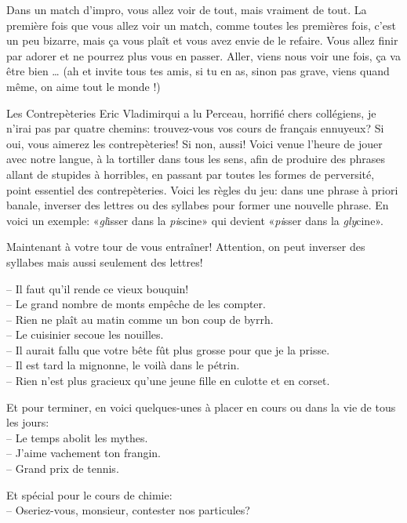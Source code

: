 \begin{article*}
\begin{spacing}{1.04}
Dans un match d’impro, vous allez voir de tout, mais vraiment de tout. La première fois que vous allez voir un match, comme toutes les premières fois, c’est un peu bizarre, mais ça vous plaît et vous avez envie de le refaire. Vous allez finir par adorer et ne pourrez plus vous en passer. Aller, viens nous voir une fois, ça va être bien … (ah et invite tous tes amis, si tu en as, sinon pas grave, viens quand même, on aime tout le monde !)\end{spacing}
\end{article*}

\newpage




\vspace*{-2.1cm}
\begin{article}
{Les Contrepèteries}
{Eric Vladimir}{qui a lu Perceau, horrifié}
\vspace{5mm}
 chers collégiens, je n’irai pas par quatre chemins: trouvez-vous vos cours de français ennuyeux? Si oui, vous aimerez les contrepèteries! Si non, aussi! Voici venue l’heure de jouer avec notre langue, à la tortiller dans tous les sens, afin de produire des phrases allant de stupides à horribles, en passant par toutes les formes de perversité, point essentiel des contrepèteries. Voici les règles du jeu: dans une phrase à priori banale, inverser des lettres ou des syllabes pour former une nouvelle phrase. En voici un exemple: «\textit{gl}isser dans la \textit{pi}scine» \columnbreak qui devient «\textit{pi}sser dans la \textit{gly}cine».

Maintenant à votre tour de vous entraîner! Attention, on peut inverser des syllabes mais aussi seulement des lettres!

-- Il faut qu’il rende ce vieux bouquin!\\
-- Le grand nombre de monts empêche de les compter.\\
-- Rien ne plaît au matin comme un bon coup de byrrh.\\
-- Le cuisinier secoue les nouilles.\\
-- Il aurait fallu que votre bête fût plus grosse pour que je la prisse.\\
-- Il est tard la mignonne, le voilà dans le pétrin.\\
-- Rien n’est plus gracieux qu’une jeune fille en culotte et en corset.

Et pour terminer, en voici quelques-unes à placer en cours ou dans la vie de tous les jours:\\
-- Le temps abolit les mythes.\\
-- J'aime vachement ton frangin.\\
-- Grand prix de tennis.

Et spécial pour le cours de chimie:\\
-- Oseriez-vous, monsieur, contester nos particules?
\end{article}

